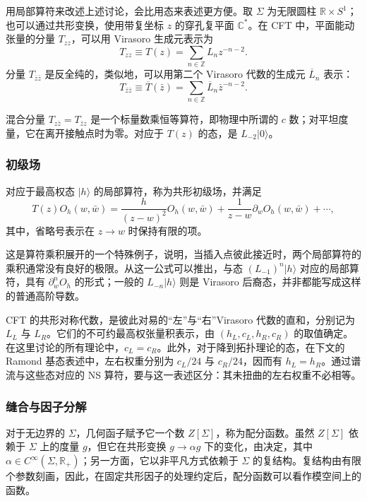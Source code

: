 用局部算符来改述上述讨论，会比用态来表述更方便。取 $\Sigma$ 为无限圆柱 $\mathbb{R}\times S^1$；也可以通过共形变换，使用带复坐标 $z$ 的穿孔复平面 $\mathbb{C}^*$。在 CFT 中，平面能动张量的分量 $T_{zz}$，可以用 Virasoro 生成元表示为
\[
T_{zz}\equiv T(z)=\sum_{n\in\mathbb{Z}}L_nz^{-n-2}.
\]
分量 $T_{\bar z\bar z}$ 是反全纯的，类似地，可以用第二个 Virasoro 代数的生成元 $\overline L_n$ 表示：
\[
T_{\bar z\bar z}\equiv\overline T(\bar z)
=\sum_{n\in\mathbb{Z}}\overline L_n\bar z^{-n-2}.
\]

混合分量 $T_{z\bar z}=T_{\bar zz}$ 是一个标量数乘恒等算符，即物理中所谓的 $c$ 数；对平坦度量，它在离开接触点时为零。对应于 $T(z)$ 的态，是 $L_{-2}|0\rangle$。

\subsubsection{初级场}\label{sec:3.2.2.2}

\begin{definition*}\label{def:3.primary-field}
对应于最高权态 $|h\rangle$ 的局部算符，称为共形初级场，并满足
\[
T(z)O_h(w,\bar w)
=\frac{h}{(z-w)^2}O_h(w,\bar w)
+\frac1{z-w}\partial_wO_h(w,\bar w)+\cdots,
\]
其中，省略号表示在 $z\to w$ 时保持有限的项。
\end{definition*}
这是算符乘积展开的一个特殊例子，说明，当插入点彼此接近时，两个局部算符的乘积通常没有良好的极限。从这一公式可以推出，与态 $(L_{-1})^n|h\rangle$ 对应的局部算符，具有 $\partial_w^nO_h$ 的形式；一般的 $L_{-n}|h\rangle$ 则是 Virasoro 后裔态，并非都能写成这样的普通高阶导数。

CFT 的共形对称代数，是彼此对易的“左”与“右”Virasoro 代数的直和，分别记为 $L_L$ 与 $L_R$。它们的不可约最高权张量积表示，由 $(h_L,c_L,h_R,c_R)$ 的取值确定。在这里讨论的所有理论中，$c_L=c_R$。此外，对于降到拓扑理论的态，在下文的 Ramond 基态表述中，左右权重分别为 $c_L/24$ 与 $c_R/24$，因而有 $h_L=h_R$。通过谱流与这些态对应的 NS 算符，要与这一表述区分：其未扭曲的左右权重不必相等。

\subsubsection{缝合与因子分解}\label{sec:3.2.2.3}

对于无边界的 $\Sigma$，几何函子赋予它一个数 $Z[\Sigma]$，称为配分函数。虽然 $Z[\Sigma]$ 依赖于 $\Sigma$ 上的度量 $g$，但它在共形变换 $g\to\alpha g$ 下的变化，由决定，其中 $\alpha\in C^\infty(\Sigma,\mathbb{R}_+)$；另一方面，它以非平凡方式依赖于 $\Sigma$ 的复结构。复结构由有限个参数刻画，因此，在固定共形因子的处理约定后，配分函数可以看作模空间上的函数。

